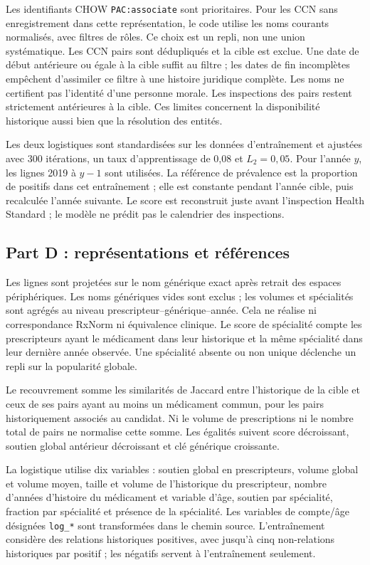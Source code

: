 \documentclass[10pt,a4paper]{article}
\newcommand{\src}[1]{{\small\nolinkurl{#1}}}
\begin{document}
Les identifiants CHOW \src{PAC:associate} sont prioritaires. Pour les CCN sans enregistrement dans cette représentation, le code utilise les noms courants normalisés, avec filtres de rôles. Ce choix est un repli, non une union systématique. Les CCN pairs sont dédupliqués et la cible est exclue. Une date de début antérieure ou égale à la cible suffit au filtre ; les dates de fin incomplètes empêchent d'assimiler ce filtre à une histoire juridique complète. Les noms ne certifient pas l'identité d'une personne morale. Les inspections des pairs restent strictement antérieures à la cible. Ces limites concernent la disponibilité historique aussi bien que la résolution des entités\cite{hgbcode}.

Les deux logistiques sont standardisées sur les données d'entraînement et ajustées avec 300 itérations, un taux d'apprentissage de 0,08 et $L_2=0,05$. Pour l'année $y$, les lignes 2019 à $y-1$ sont utilisées. La référence de prévalence est la proportion de positifs dans cet entraînement ; elle est constante pendant l'année cible, puis recalculée l'année suivante. Le score est reconstruit juste avant l'inspection Health Standard ; le modèle ne prédit pas le calendrier des inspections.

\subsection{Part D : représentations et références}
Les lignes sont projetées sur le nom générique exact après retrait des espaces périphériques. Les noms génériques vides sont exclus ; les volumes et spécialités sont agrégés au niveau prescripteur--générique--année. Cela ne réalise ni correspondance RxNorm ni équivalence clinique. Le score de spécialité compte les prescripteurs ayant le médicament dans leur historique et la même spécialité dans leur dernière année observée. Une spécialité absente ou non unique déclenche un repli sur la popularité globale.

Le recouvrement somme les similarités de Jaccard entre l'historique de la cible et ceux de ses pairs ayant au moins un médicament commun, pour les pairs historiquement associés au candidat. Ni le volume de prescriptions ni le nombre total de pairs ne normalise cette somme. Les égalités suivent score décroissant, soutien global antérieur décroissant et clé générique croissante\cite{hgbcode,hgbpartd}.

La logistique utilise dix variables : soutien global en prescripteurs, volume global et volume moyen, taille et volume de l'historique du prescripteur, nombre d'années d'histoire du médicament et variable d'âge, soutien par spécialité, fraction par spécialité et présence de la spécialité. Les variables de compte/âge désignées \src{log_*} sont transformées dans le chemin source. L'entraînement considère des relations historiques positives, avec jusqu'à cinq non-relations historiques par positif ; les négatifs servent à l'entraînement seulement.
\end{document}
